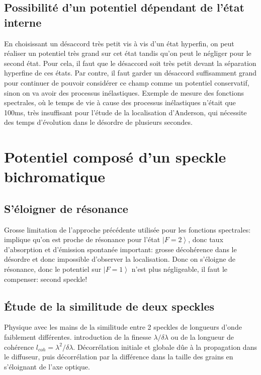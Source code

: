 \subsection{Possibilité d'un potentiel dépendant de l'état interne}
En choisissant un désaccord très petit vis à vis d'un état hyperfin, on peut réaliser un potentiel très grand sur cet état tandis qu'on peut le négliger pour le second état. Pour cela, il faut que le désaccord soit très petit devant la séparation hyperfine de ces états. Par contre, il faut garder un désaccord suffisamment grand pour continuer de pouvoir considérer ce champ comme un potentiel conservatif, sinon on va avoir des processus inélastiques. Exemple de mesure des fonctions spectrales, où le temps de vie à cause des processus inélastiques n'était que 100ms, très insuffisant pour l'étude de la localisation d'Anderson, qui nécessite des temps d'évolution dans le désordre de plusieurs secondes.

\section{Potentiel composé d'un speckle bichromatique}
\subsection{S'éloigner de résonance}
Grosse limitation de l'approche précédente utilisée pour les fonctions spectrales: implique qu'on est proche de résonance pour l'état $\left| F=2 \right\rangle$, donc taux d'absorption et d'émission spontanée important: grosse décohérence dans le désordre et donc impossible d'observer la localisation.
Donc on s'éloigne de résonance, donc le potentiel sur $\left| F=1 \right\rangle$ n'est plus négligeable, il faut le compenser: second speckle! 
\subsection{Étude de la similitude de deux speckles}
Physique avec les mains de la similitude entre 2 speckles de longueurs d'onde faiblement différentes. introduction de la finesse $\lambda / \delta\lambda$ ou de la longueur de cohérence $l_{coh}=\lambda^2/\delta\lambda$.
Décorrélation initiale et globale dûe à la propagation dans le diffuseur, puis décorrélation par la différence dans la taille des grains en s'éloignant de l'axe optique.